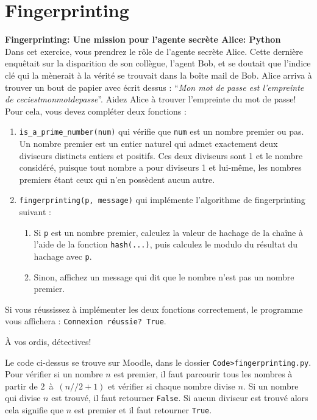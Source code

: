 \section{Fingerprinting}
\begin{Exercice}[15 minutes]\textbf{Fingerprinting: Une mission pour l'agente secrète Alice: Python}\\
    Dans cet exercice, vous prendrez le rôle de l'agente secrète Alice. Cette dernière enquêtait sur la disparition de son collègue,
    l'agent Bob, et se doutait que l'indice clé qui la mènerait à la vérité se trouvait dans la boîte mail de Bob. Alice arriva à trouver
    un bout de papier avec écrit dessus : ``\textit{Mon mot de passe est l'empreinte de ceciestmonmotdepasse}''. Aidez Alice à trouver l'empreinte du mot de passe! \\

    Pour cela, vous devez compléter deux fonctions :
    \begin{enumerate}
        \item \lstinline{is_a_prime_number(num)} qui vérifie que \lstinline{num} est un nombre premier ou pas. Un nombre premier est un entier naturel 
        qui admet exactement deux diviseurs distincts entiers et positifs. Ces deux diviseurs sont 1 et le nombre considéré, 
        puisque tout nombre a pour diviseurs 1 et lui-même, les nombres premiers étant ceux qui n’en possèdent aucun autre.
        
        \item \lstinline{fingerprinting(p, message)} qui implémente l'algorithme de fingerprinting suivant :
              \begin{enumerate}
                  \item Si \lstinline{p} est un nombre premier, calculez la valeur de hachage de la chaîne à l'aide de la fonction \lstinline{hash(...)}, puis calculez le modulo du résultat du hachage avec \lstinline{p}.
                  \item Sinon, affichez un message qui dit que le nombre n'est pas un nombre premier.    
              \end{enumerate}
    \end{enumerate}

    Si vous réussissez à implémenter les deux fonctions correctement, le programme vous affichera : \lstinline{Connexion réussie? True}.

    À vos ordis, détectives!

    
\begin{conseil}
Le code ci-dessus se trouve sur Moodle, dans le dossier \lstinline{Code>fingerprinting.py}.\\
Pour vérifier si un nombre $n$ est premier, il faut  parcourir tous les nombres à partir de $2$~à~$(n//2+1)$ et vérifier si chaque nombre divise $n$. Si un nombre qui divise $n$ est trouvé, il faut retourner \lstinline{False}. Si aucun diviseur est trouvé alors cela signifie que $n$ est premier et il faut retourner \lstinline{True}.
\end{conseil}


\end{Exercice}
